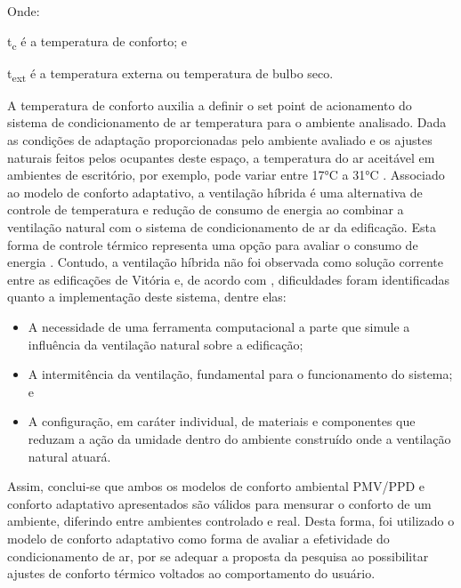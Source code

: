 Onde:\par
\setlength\parindent{1.5cm} t\textsubscript{c} é a temperatura de conforto; e\par
\setlength\parindent{1.5cm} t\textsubscript{ext} é a temperatura externa ou temperatura de bulbo seco.\par
\noindent A temperatura de conforto auxilia a definir o set point de acionamento do sistema de condicionamento de ar temperatura para o ambiente analisado. Dada as condições de adaptação proporcionadas pelo ambiente avaliado e os ajustes naturais feitos pelos ocupantes deste espaço, a temperatura do ar aceitável em ambientes de escritório, por exemplo, pode variar entre 17°C a 31°C \cite{AmericanSocietyofHeatingRefrigeratingandAir-ConditioningEngineers-ASHRAE2017a}.\vspace*{0.3cm} \newline
Associado ao modelo de conforto adaptativo, a ventilação híbrida é uma alternativa de controle de temperatura e redução de consumo de energia ao combinar a ventilação natural com o sistema de condicionamento de ar da edificação. Esta forma de controle térmico representa uma opção para avaliar o consumo de energia \cite{AmericanSocietyofHeatingRefrigeratingandAir-ConditioningEngineers-ASHRAE2017}.\vspace*{0.3cm} \newline
Contudo, a ventilação híbrida não foi observada como solução corrente entre as edificações de Vitória e, de acordo com \textcite{Shaviv2001,Zhang2014,Navarro2016,SCHULZE2018,Sudhakar2019}, dificuldades foram identificadas quanto a implementação deste sistema, dentre elas:
\begin{itemize}
    \item A necessidade de uma ferramenta computacional a parte que simule a influência 
    da ventilação natural sobre a edificação;
    \item A intermitência da ventilação, fundamental para o funcionamento do sistema; e
    \item A configuração, em caráter individual, de materiais e componentes que reduzam 
    a ação da umidade dentro do ambiente construído onde a ventilação natural atuará.
\end{itemize}
Assim, conclui-se que ambos os modelos de conforto ambiental PMV/PPD e conforto adaptativo apresentados são válidos para mensurar o conforto de um ambiente, diferindo entre ambientes controlado e real. Desta forma, foi utilizado o modelo de conforto adaptativo como forma de avaliar a efetividade do condicionamento de ar, por se adequar a proposta da pesquisa ao possibilitar ajustes de conforto térmico voltados ao comportamento do usuário.
